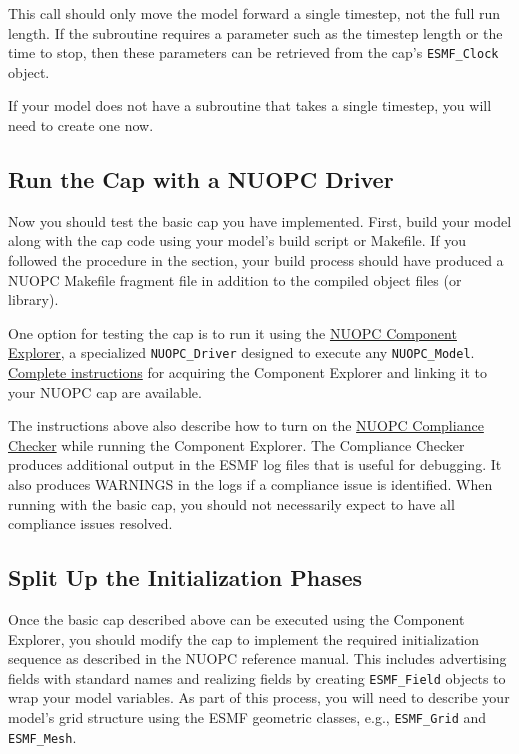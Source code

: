 This call should only move the model forward a single timestep,
not the full run length.  If the subroutine requires a parameter 
such as the timestep length or the time to stop, then these 
parameters can be retrieved from the cap's {\tt ESMF\_Clock} object.

If your model does not have a subroutine that takes a single timestep,
you will need to create one now.


\subsection{Run the Cap with a NUOPC Driver}
\label{sec:runcapwithdriver}
Now you should test the basic cap you have implemented. First,
build your model along with the cap code using your model's build
script or Makefile.  If you followed the procedure in the 
section, your build process should have produced a NUOPC Makefile
fragment file in addition to the compiled object files (or library).

One option for testing the cap is to run it using the \href{https://www.earthsystemcog.org/projects/nuopc/compliance\_testing}{NUOPC
Component Explorer}, a specialized {\tt NUOPC\_Driver} designed to execute any {\tt NUOPC\_Model}.  
\href{https://www.earthsystemcog.org/projects/nuopc/compliance\_test}{Complete instructions} for acquiring 
the Component Explorer and linking it to your NUOPC cap are available.

The instructions above also describe how to turn on the \href{https://www.earthsystemcog.org/projects/nuopc/compliance\_testing}{NUOPC
Compliance Checker} while running the Component Explorer.  The
Compliance Checker produces additional output in the ESMF log
files that is useful for debugging.  It also produces WARNINGS
in the logs if a compliance issue is identified.  When running with
the basic cap, you should not necessarily expect to have all compliance issues
resolved.


\subsection{Split Up the Initialization Phases}
\label{sec:splitinit}
Once the basic cap described above can be executed using the Component Explorer,
you should modify the cap to implement the required initialization sequence
as described in the NUOPC reference manual. This
includes advertising fields with standard names and realizing fields by creating
{\tt ESMF\_Field} objects to wrap your model variables.  As part of this process,
you will need to describe your model's grid structure using the ESMF geometric
classes, e.g., {\tt ESMF\_Grid} and {\tt ESMF\_Mesh}.


